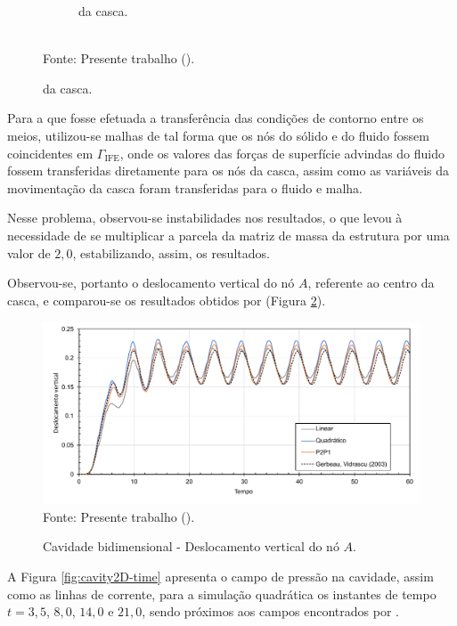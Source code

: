 \begin{figure}[h!]
\begin{subfigure}[b]{0.32\textwidth}
        \caption{da casca.}
    \end{subfigure}
    \\Fonte: Presente trabalho (\the\year).
    \label{fig:Cavity2D-mesh}
\end{figure}

Para a que fosse efetuada a transferência das condições de contorno entre os meios, utilizou-se malhas de tal forma que os nós do sólido e do fluido fossem coincidentes em $\Gamma_\mathrm{IFE}$, onde os valores das forças de superfície advindas do fluido fossem transferidas diretamente para os nós da casca, assim como as variáveis da movimentação da casca foram transferidas para o fluido e malha.

Nesse problema, observou-se instabilidades nos resultados, o que levou à necessidade de se multiplicar a parcela da matriz de massa da estrutura por uma valor de $2,0$, estabilizando, assim, os resultados.

Observou-se, portanto o deslocamento vertical do nó $A$, referente ao centro da casca, e comparou-se os resultados obtidos por  (Figura \ref{fig:cavity2D-res}).

\begin{figure}[h!]
    \centering
    \caption{Cavidade bidimensional - Deslocamento vertical do nó $A$.}
    \includegraphics[width=\linewidth]{Figuras/FSI-Cavity2D/resultados.pdf}
    \\Fonte: Presente trabalho (\the\year).
    \label{fig:cavity2D-res}
\end{figure}

A Figura \ref{fig:cavity2D-time} apresenta o campo de pressão na cavidade, assim como as linhas de corrente, para a simulação quadrática os instantes de tempo $t=3,5$, $8,0$, $14,0$ e $21,0$, sendo próximos aos campos encontrados por .

